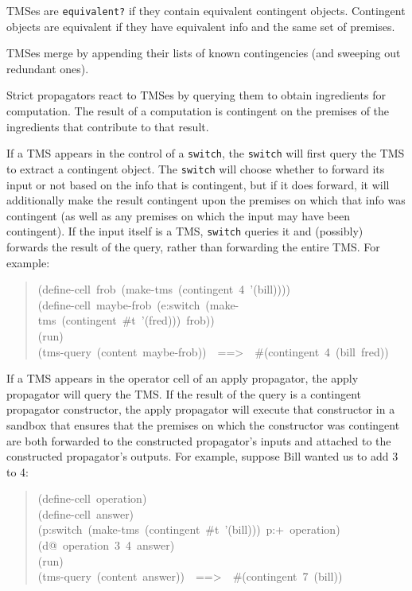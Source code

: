\documentclass[12pt,letterpaper,english]{article}
\begin{document}
TMSes are \texttt{equivalent?} if they contain equivalent contingent
objects.  Contingent objects are equivalent if they have equivalent
info and the same set of premises.

TMSes merge by appending their lists of known contingencies (and
sweeping out redundant ones).

Strict propagators react to TMSes by querying them to obtain
ingredients for computation.  The result of a computation is
contingent on the premises of the ingredients that contribute to that
result.

If a TMS appears in the control of a \texttt{switch}, the \texttt{switch} will
first query the TMS to extract a contingent object.  The \texttt{switch}
will choose whether to forward its input or not based on the info that
is contingent, but if it does forward, it will additionally make the
result contingent upon the premises on which that info was contingent
(as well as any premises on which the input may have been contingent).
If the input itself is a TMS, \texttt{switch} queries it and (possibly)
forwards the result of the query, rather than forwarding the entire
TMS.  For example:
\begin{quote}{\ttfamily \raggedright \noindent
(define-cell~frob~(make-tms~(contingent~4~'(bill))))~\\
(define-cell~maybe-frob~(e:switch~(make-tms~(contingent~{\#}t~'(fred)))~frob))~\\
(run)~\\
(tms-query~(content~maybe-frob))~~==>~~{\#}(contingent~4~(bill~fred))
}\end{quote}

If a TMS appears in the operator cell of an apply propagator, the
apply propagator will query the TMS.  If the result of the query is a
contingent propagator constructor, the apply propagator will execute
that constructor in a sandbox that ensures that the premises on which
the constructor was contingent are both forwarded to the constructed
propagator's inputs and attached to the constructed propagator's
outputs.  For example, suppose Bill wanted us to add 3 to 4:
\begin{quote}{\ttfamily \raggedright \noindent
(define-cell~operation)~\\
(define-cell~answer)~\\
(p:switch~(make-tms~(contingent~{\#}t~'(bill)))~p:+~operation)~\\
(d@~operation~3~4~answer)~\\
(run)~\\
(tms-query~(content~answer))~~==>~~{\#}(contingent~7~(bill))
}\end{quote}
\end{document}
